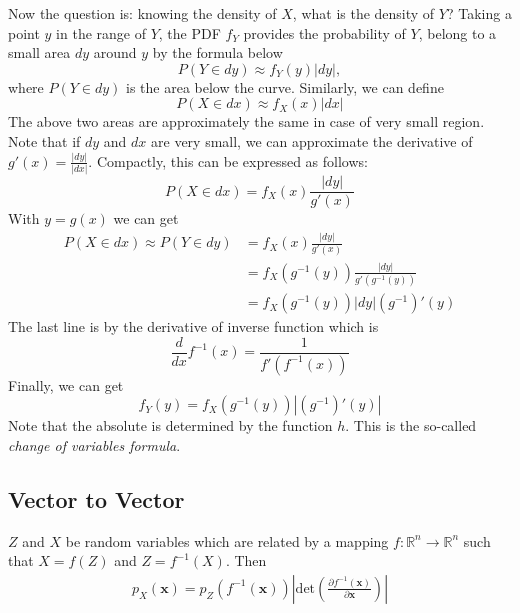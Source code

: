 Now the question is: knowing the density of $X$, what is the density of $Y$?
Taking a point $y$ in the range of $Y$, the PDF $f_Y$ provides the probability of $Y$, belong to a small area $dy$ around $y$ by the formula below
$$P(Y\in dy)\approx f_Y(y)|dy|,$$
where $P(Y\in dy)$ is the area below the curve. Similarly, we can define
$$P(X\in dx)\approx f_X(x)|dx|$$
The above two areas are approximately the same in case of very small region. Note that if $dy$ and $dx$ are very small, we can approximate the derivative of $g'(x)=\frac{|dy|}{|dx|}$. Compactly, this can be expressed as follows:
$$P(X\in dx) = f_X(x)\frac{|dy|}{g'(x)}$$
With $y=g(x)$ we can get 
\begin{align*}
	P(X\in dx)\approx P(Y\in dy) &= f_X(x)\frac{|dy|}{g'(x)}\\
	& = f_X(g^{-1}(y))\frac{|dy|}{g'(g^{-1}(y))}\\
	& = f_X(g^{-1}(y))|dy|(g^{-1})'(y)
\end{align*}
The last line is by the derivative of inverse function which is 
$$\frac{d}{dx}f^{-1}(x) = \frac{1}{f'(f^{-1}(x))}$$
Finally, we can get 
$$f_Y(y) = f_X(g^{-1}(y))|(g^{-1})'(y)|$$
Note that the absolute is determined by the function $h$. This is the so-called \textit{change of variables formula}.



\subsection{Vector to Vector}

$Z$ and $X$ be random variables which are related by a mapping $f:\mathbb{R}^n\to \mathbb{R}^n$ such that $X=f(Z)$ and $Z=f^{-1}(X)$. Then
\begin{align*}
	p_X(\mathbf{x}) = p_Z(f^{-1}(\mathbf{x})) \left\vert \text{det}\left(\frac{\partial f^{-1}(\mathbf{x})}{\partial \mathbf{x}}\right) \right\vert
\end{align*}

